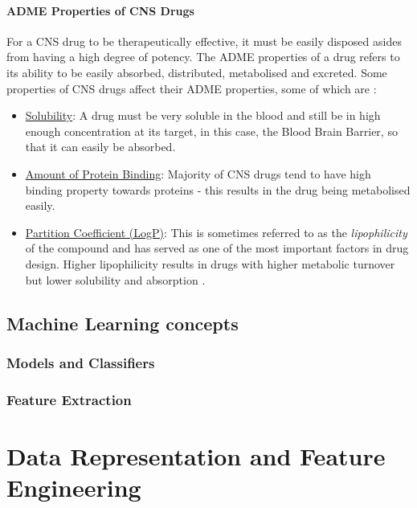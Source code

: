 \documentclass[a4paper,12pt]{report}
\begin{document}
		\subsubsection{ADME Properties of CNS Drugs}
		For a CNS drug to be therapeutically effective, it must be easily disposed asides from having a high degree of potency. The ADME properties of a drug refers to its ability to be easily absorbed, distributed, metabolised and excreted. Some properties of CNS drugs affect their ADME properties, some of which are \cite{Hassanetal2005}:
			\begin{itemize}
				\item \underline{Solubility}: A drug must be very soluble in the blood and still be in high enough concentration at its target, in this case, the Blood Brain Barrier, so that it can easily be absorbed.
				\item \underline{Amount of Protein Binding}: Majority of CNS drugs tend to have high binding property towards proteins - this results in the drug being metabolised easily.
				\item \underline{Partition Coefficient (LogP)}: This is sometimes referred to as the \textit{lipophilicity} of the compound and has served as one of the most important factors in drug design. Higher lipophilicity results in drugs with higher metabolic turnover but lower solubility and absorption \cite{Hassanetal2005}. 
			\end{itemize}

	\section{Machine Learning concepts}
		\subsection{Models and Classifiers}
		\subsection{Feature Extraction}
	
	

\chapter{Data Representation and Feature Engineering}
\end{document}
